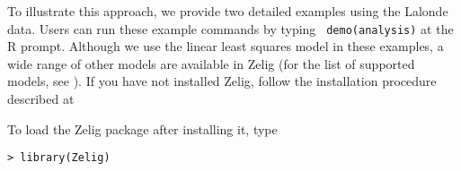 To illustrate this approach, we provide two detailed examples using
the Lalonde data. Users can run these example commands by typing {\tt
  demo(analysis)} at the R prompt. Although we use the linear least
squares model in these examples, a wide range of other models are
available in Zelig (for the list of supported models, see
).
If you have not installed Zelig, follow the installation procedure
described at


To load the Zelig package after installing it, type
\begin{verbatim}
> library(Zelig)
\end{verbatim}

